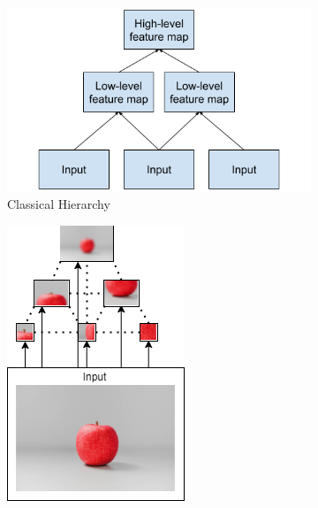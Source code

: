 \begin{figure}[htb]
    \centering
    \begin{subfigure}[t]{0.55\textwidth}
        \centering
        \includegraphics[width=1\linewidth]{resources/related_works/hierarchy.png}
        \caption{Classical Hierarchy}
        \label{fig:my_label}
    \end{subfigure}
    \hfill
    \begin{subfigure}[t]{0.3\textwidth}
        \centering
        \includegraphics[width=1\linewidth]{resources/related_works/thousand_brains.png}

\end{subfigure}
\end{figure}
